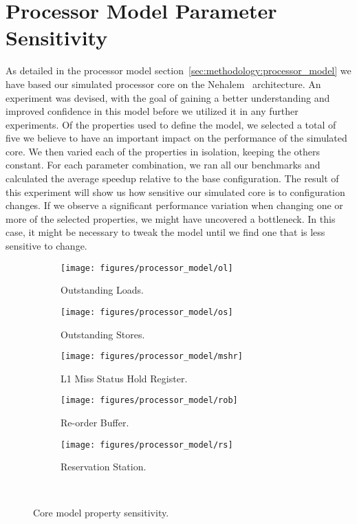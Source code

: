 
\section{Processor Model Parameter Sensitivity}
\label{sec:results:model_sensitivity}

As detailed in the processor model section~\ref{sec:methodology:processor_model} we have based our simulated processor core on the Nehalem~\cite{Thomadakis2011} architecture.
An experiment was devised, with the goal of gaining a better understanding and improved confidence in this model before we utilized it in any further experiments.
Of the properties used to define the model, we selected a total of five we believe to have an important impact on the performance of the simulated core.
We then varied each of the properties in isolation, keeping the others constant.
For each parameter combination, we ran all our benchmarks and calculated the average speedup relative to the base configuration.
The result of this experiment will show us how sensitive our simulated core is to configuration changes.
If we observe a significant performance variation when changing one or more of the selected properties, we might have uncovered a bottleneck.
In this case, it might be necessary to tweak the model until we find one that is less sensitive to change.

\begin{figure}[H]
        \centering
        \begin{subfigure}[b]{0.5\textwidth}
                \texttt{[image: figures/processor\_model/ol]}
                \caption{Outstanding Loads.}
                \label{fig:results:processor_model:ol}
        \end{subfigure}%
        \begin{subfigure}[b]{0.5\textwidth}
                \texttt{[image: figures/processor\_model/os]}
                \caption{Outstanding Stores.}
                \label{fig:results:processor_model:os}
        \end{subfigure}
        \begin{subfigure}[b]{0.5\textwidth}
                \texttt{[image: figures/processor\_model/mshr]}
                \caption{L1 Miss Status Hold Register.}
                \label{fig:results:processor_model:mshr}
        \end{subfigure}%
        \begin{subfigure}[b]{0.5\textwidth}
                \texttt{[image: figures/processor\_model/rob]}
                \caption{Re-order Buffer.}
                \label{fig:results:processor_model:rob}
        \end{subfigure}
        \begin{subfigure}[b]{0.5\textwidth}
                \texttt{[image: figures/processor\_model/rs]}
                \caption{Reservation Station.}
                \label{fig:results:processor_model:rs}
        \end{subfigure}%
        \caption{Core model property sensitivity.}
        \label{fig:results:processor_model}
       ~ %
\end{figure}

